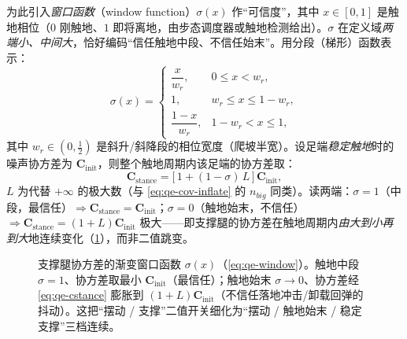 为此引入\emph{窗口函数}（window function）$\sigma(x)$ 作“可信度”，其中 $x\in[0,1]$ 是触地相位（$0$ 刚触地、$1$ 即将离地，由步态调度器或触地检测给出）。$\sigma$ 在定义域\emph{两端小、中间大}，恰好编码“信任触地中段、不信任始末”。用分段（梯形）函数表示\cite{unitree2023quadruped}：
\begin{equation}
  \sigma(x)=\begin{cases}
    \dfrac{x}{w_r}, & 0\le x< w_r,\\[6pt]
    1, & w_r\le x\le 1-w_r,\\[4pt]
    \dfrac{1-x}{w_r}, & 1-w_r< x\le 1,
  \end{cases}
  \label{eq:qe-window}
\end{equation}
其中 $w_r\in(0,\tfrac12)$ 是斜升/斜降段的相位宽度（爬坡半宽）。设足端\emph{稳定触地}时的噪声协方差为 $\mathbf{C}_{\mathrm{init}}$，则整个触地周期内该足端的协方差取\cite{unitree2023quadruped}：
\begin{equation}
  \mathbf{C}_{\mathrm{stance}}=\big[\,1+(1-\sigma)\,L\,\big]\,\mathbf{C}_{\mathrm{init}},
  \label{eq:qe-cstance}
\end{equation}
$L$ 为代替 $+\infty$ 的极大数（与 \cref{eq:qe-cov-inflate} 的 $n_{big}$ 同类）。读两端：$\sigma=1$（中段，最信任）$\Rightarrow\mathbf{C}_{\mathrm{stance}}=\mathbf{C}_{\mathrm{init}}$；$\sigma=0$（触地始末，不信任）$\Rightarrow\mathbf{C}_{\mathrm{stance}}=(1+L)\mathbf{C}_{\mathrm{init}}$ 极大——即支撑腿的协方差在触地周期内\emph{由大到小再到大}地连续变化（\cref{fig:qe-window}），而非二值跳变。

\begin{figure}[ht]
\centering
{}
\caption{支撑腿协方差的渐变窗口函数 $\sigma(x)$（\cref{eq:qe-window}）。触地中段 $\sigma=1$、协方差取最小 $\mathbf{C}_{\mathrm{init}}$（最信任）；触地始末 $\sigma\to0$、协方差经 \cref{eq:qe-cstance} 膨胀到 $(1+L)\mathbf{C}_{\mathrm{init}}$（不信任落地冲击/卸载回弹的抖动）。这把“摆动 / 支撑”二值开关细化为“摆动 / 触地始末 / 稳定支撑”三档连续。}
\label{fig:qe-window}
\end{figure}

